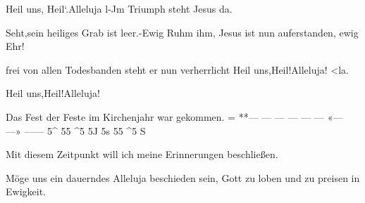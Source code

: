 \documentclass[a4paper,11pt]{article}
\begin{document}
Heil uns, Heil‘.Alleluja l-Jm Triumph steht Jesus da.

Seht,sein heiliges Grab ist leer.-Ewig Ruhm ihm, Jesus ist nun auferstanden,	ewig Ehr!

frei von allen Todesbanden steht er nun verherrlicht Heil uns,Heil!Alleluja!	<la.

Heil uns,Heil!Alleluja!

Das Fest der Feste im Kirchenjahr war gekommen. = **— — — — — —	«— —» ——	5^ 55 ^5 5J 5s 55 ^5 S

Mit diesem Zeitpunkt will ich meine Erinnerungen beschließen.

Möge uns ein dauerndes Alleluja beschieden sein, Gott zu loben und zu preisen in Ewigkeit.
\end{document}
